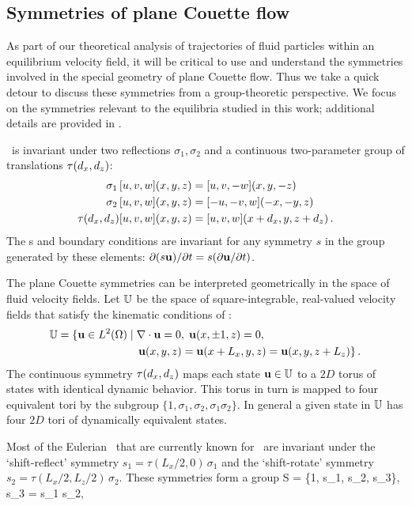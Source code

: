 \documentclass[letter,12pt,openany]{article}
\begin{document}
\subsection{Symmetries of plane Couette flow}
\label{PCF_symm}

As part of our theoretical analysis of trajectories of fluid particles within an equilibrium velocity field, it will be critical to use and understand the symmetries involved in the special geometry of plane Couette flow. Thus we take a quick detour to discuss these symmetries from a group-theoretic perspective. We focus on the symmetries relevant to the equilibria studied in this work; additional details are provided in \cite{HalcrowThesis}.


\PCf\ is invariant under two reflections $\sigma_1,\sigma_2$ and a
continuous two-parameter group of translations $\tau(d_x, d_z)$:
\begin{align}
\sigma_1 \, [u,v,w](x,y,z) &= [u, v,-w](x,y,-z) \nonumber \\
\sigma_2 \, [u,v,w](x,y,z) &= [-u,-v,w](-x,-y,z)  \label{reflSfit1}\\
\tau(d_x, d_z)[u,v,w](x,y,z) &= [u,v,w](x+d_x,y,z+d_z) \nonumber\,.
\end{align}
The \NSe s and boundary conditions are invariant for any symmetry $s$
in the group generated by these elements:
$\partial (s {\bf u}) / \partial t = s (\partial {\bf u} / \partial t)$.

The plane Couette symmetries can be interpreted geometrically in the space of
fluid velocity fields. Let $\mathbb{U}$ be the space of
square-integrable, real-valued velocity fields that satisfy the kinematic
conditions of \pCf:
\begin{align}
 \bbU  &= \{\bu \in L^2(\Omega) \; | \; \grad \cdot \bu = 0,
               \; \bu(x, \pm 1, z) = 0, \notag  \\
         &\phantom{=} {} \qquad \qquad \qquad \; \; %
          \bu(x, y, z) = \bu(x+L_x, y, z) = \bu(x, y, z + L_z)\}  \,.
\end{align} 
The continuous symmetry $\tau(d_x, d_z)$ maps each state
${\bf u} \in \mathbb{U}$ to a $2D$ torus of states with identical dynamic
behavior. This torus in turn is mapped to four equivalent tori by
the subgroup $\{1,\sigma_1,\sigma_2, \sigma_1 \sigma_2\}$. In
general a given state in $\mathbb{U}$ has four $2D$ tori of dynamically
equivalent states.

Most of the Eulerian \eqva\ that are currently known for \pCf\
are invariant under the `shift-reflect' symmetry
$s_1 = \tau(L_x/2,0) \, \sigma_1$ and the `shift-rotate' symmetry
$s_2 = \tau(L_x/2,L_z/2) \, \sigma_2$.  These symmetries form a group
\beq
S = \{1, s_1, s_2, s_3\}, \qquad s_3 = s_1 s_2, 
\eeq
\end{document}
